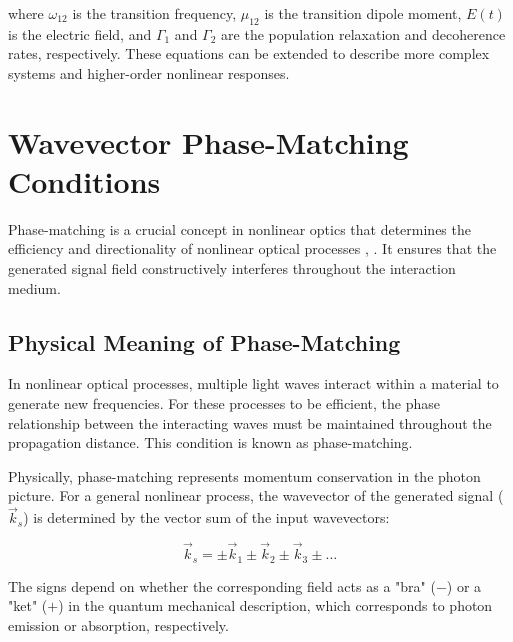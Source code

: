 \noindent where $\omega_{12}$ is the transition frequency, $\mu_{12}$ is the transition dipole moment, $E(t)$ is the electric field, and $\Gamma_1$ and $\Gamma_2$ are the population relaxation and decoherence rates, respectively. These equations can be extended to describe more complex systems and higher-order nonlinear responses.


\section{Wavevector Phase-Matching Conditions}
\label{sec:phase_matching}

\noindent Phase-matching is a crucial concept in nonlinear optics that determines the efficiency and directionality of nonlinear optical processes \cite{boyd2008contents},  . It ensures that the generated signal field constructively interferes throughout the interaction medium.

\subsection{Physical Meaning of Phase-Matching}
\label{subsec:phase_matching_meaning}

\noindent In nonlinear optical processes, multiple light waves interact within a material to generate new frequencies. For these processes to be efficient, the phase relationship between the interacting waves must be maintained throughout the propagation distance. This condition is known as phase-matching.

\noindent Physically, phase-matching represents momentum conservation in the photon picture. For a general nonlinear process, the wavevector of the generated signal ($\vec{k}_s$) is determined by the vector sum of the input wavevectors:

\begin{equation}
	\vec{k}_s = \pm\vec{k}_1 \pm\vec{k}_2 \pm\vec{k}_3 \pm \ldots
	\label{eq:phase_matching}
\end{equation}

\noindent The signs depend on whether the corresponding field acts as a "bra" ($-$) or a "ket" ($+$) in the quantum mechanical description, which corresponds to photon emission or absorption, respectively.

